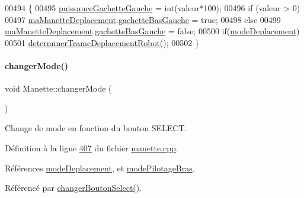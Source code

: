 \begin{DoxyCode}
00494 \{
00495     \hyperlink{class_manette_ab777328c9b35454ab45ed5e0b0a5f234}{puissanceGachetteGauche} = int(valeur*100);
00496     \textcolor{keywordflow}{if} (valeur > 0)
00497         \hyperlink{class_manette_af3d0f304c4c33e02bdf34fc99aa4dbff}{maManetteDeplacement}.\hyperlink{struct_etat_manette_deplacement_a0d197e25bc2e0402a068a8d012c25472}{gachetteBasGauche} = \textcolor{keyword}{true};
00498     \textcolor{keywordflow}{else}
00499         \hyperlink{class_manette_af3d0f304c4c33e02bdf34fc99aa4dbff}{maManetteDeplacement}.\hyperlink{struct_etat_manette_deplacement_a0d197e25bc2e0402a068a8d012c25472}{gachetteBasGauche} = \textcolor{keyword}{false};
00500     \textcolor{keywordflow}{if}(\hyperlink{class_manette_a4dc6231c8cc65fac03f59d323fa9a038}{modeDeplacement})
00501         \hyperlink{class_manette_a97a50caac68954a229c7e9461e7f4232}{determinerTrameDeplacementRobot}();
00502 \}
\end{DoxyCode}
\mbox{\label{class_manette_a202faf093876b9e95cfc316b552c59c3}} 
\paragraph{\texorpdfstring{changer\+Mode()}{changerMode()}}
{\footnotesize\ttfamily void Manette\+::changer\+Mode (\begin{DoxyParamCaption}{ }\end{DoxyParamCaption})}



Change de mode en fonction du bouton S\+E\+L\+E\+CT. 



Définition à la ligne \hyperlink{manette_8cpp_source_l00407}{407} du fichier \hyperlink{manette_8cpp_source}{manette.\+cpp}.



Références \hyperlink{manette_8h_source_l00253}{mode\+Deplacement}, et \hyperlink{manette_8h_source_l00254}{mode\+Pilotage\+Bras}.



Référencé par \hyperlink{manette_8cpp_source_l00579}{changer\+Bouton\+Select()}.


